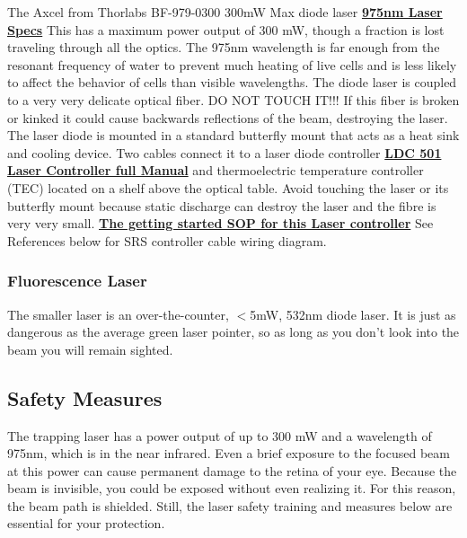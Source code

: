\documentclass{../lab}
\begin{document}
\newpage

The Axcel from Thorlabs BF-979-0300 300mW Max diode laser \href{http://experimentationlab.berkeley.edu/sites/default/files/images/975nm-Laser-Specs.pdf}{\textbf{975nm Laser Specs}} This has a maximum power output of 300 mW, though a fraction is lost traveling through all the optics. The 975nm wavelength is far enough from the resonant frequency of water to prevent much heating of live cells and is less likely to affect the behavior of cells than visible wavelengths. The diode laser is coupled to a very very delicate optical fiber. DO NOT TOUCH IT!!! If this fiber is broken or kinked it could cause backwards reflections of the beam, destroying the laser. The laser diode is mounted in a standard butterfly mount that acts as a heat sink and cooling device. Two cables connect it to a laser diode controller \href{http://experimentationlab.berkeley.edu/sites/default/files/images/LDC501m.pdf}{\textbf{LDC 501 Laser Controller full Manual}} and thermoelectric temperature controller (TEC) located on a shelf above the optical table. Avoid touching the laser or its butterfly mount because static discharge can destroy the laser and the fibre is very very small. \href{http://experimentationlab.berkeley.edu/sites/default/files/images/SOP\_Laser\_Diode\_Driver.pdf}{\textbf{The getting started SOP for this Laser controller}} See References below for SRS controller cable wiring diagram.

\subsubsection{Fluorescence Laser}

The smaller laser is an over-the-counter, $<$5mW, 532nm diode laser. It is just as dangerous as the average green laser pointer, so as long as you don't look into the beam you will remain sighted.

\subsection{Safety Measures}

The trapping laser has a power output of up to 300 mW and a wavelength of 975nm, which is in the near infrared. Even a brief exposure to the focused beam at this power can cause permanent damage to the retina of your eye. Because the beam is invisible, you could be exposed without even realizing it. For this reason, the beam path is shielded. Still, the laser safety training and measures below are essential for your protection.
\end{document}
